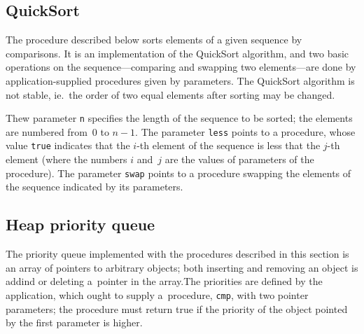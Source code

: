 \subsection{QuickSort}

The procedure described below sorts elements of a given sequence by
comparisons. It is an implementation of the QuickSort algorithm,
and two basic operations on the sequence---comparing and swapping two
elements---are done by application-supplied procedures given
by parameters. The QuickSort algorithm is not stable, ie.\ the order of
two equal elements after sorting may be changed.

\vspace{\bigskipamount}
Thew parameter \texttt{n} specifies the length of the sequence to be sorted;
the elements are numbered from~$0$ to $n-1$.
The parameter \texttt{less} points to a procedure, whose value
\texttt{true} indicates that the $i$-th element of the sequence is less that
the $j$-th element (where the numbers $i$ and~$j$ are the values of parameters
of the procedure). The parameter \texttt{swap} points to a procedure swapping the
elements of the sequence indicated by its parameters.


\newpage
\subsection{Heap priority queue}

The priority queue implemented with the procedures described in this section
is an array of pointers to arbitrary objects; both inserting and removing an
object is addind or deleting a~pointer in the array.The priorities are defined
by the application, which ought to supply a~procedure, \texttt{cmp}, with
two pointer parameters; the procedure must return true if the priority
of the object pointed by the first parameter is higher.

\vspace{\bigskipamount}


